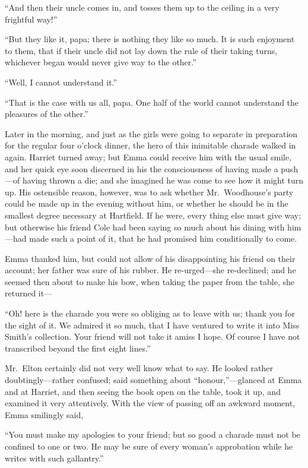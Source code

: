 ``And then their uncle comes in, and tosses them up to the ceiling
in a very frightful way!''

``But they like it, papa; there is nothing they like so much.
It is such enjoyment to them, that if their uncle did not lay down
the rule of their taking turns, whichever began would never give way
to the other.''

``Well, I cannot understand it.''

``That is the case with us all, papa.  One half of the world cannot
understand the pleasures of the other.''

Later in the morning, and just as the girls were going to separate
in preparation for the regular four o'clock dinner, the hero
of this inimitable charade walked in again.  Harriet turned away;
but Emma could receive him with the usual smile, and her quick eye
soon discerned in his the consciousness of having made a push---of
having thrown a die; and she imagined he was come to see how it
might turn up.  His ostensible reason, however, was to ask whether
Mr.\ Woodhouse's party could be made up in the evening without him,
or whether he should be in the smallest degree necessary at Hartfield.
If he were, every thing else must give way; but otherwise his friend
Cole had been saying so much about his dining with him---had made
such a point of it, that he had promised him conditionally to come.

Emma thanked him, but could not allow of his disappointing his
friend on their account; her father was sure of his rubber.
He re-urged---she re-declined; and he seemed then about to make
his bow, when taking the paper from the table, she returned it---%

``Oh! here is the charade you were so obliging as to leave with us;
thank you for the sight of it.  We admired it so much, that I have
ventured to write it into Miss Smith's collection.  Your friend
will not take it amiss I hope.  Of course I have not transcribed
beyond the first eight lines.''

Mr.\ Elton certainly did not very well know what to say.
He looked rather doubtingly---rather confused; said something about
``honour,''---glanced at Emma and at Harriet, and then seeing the book
open on the table, took it up, and examined it very attentively.
With the view of passing off an awkward moment, Emma smilingly said,

``You must make my apologies to your friend; but so good a charade
must not be confined to one or two.  He may be sure of every woman's
approbation while he writes with such gallantry.''


